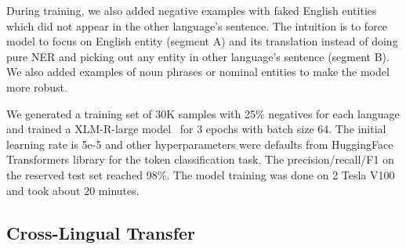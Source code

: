 \documentclass[11pt]{article}
\begin{document}
During training, we also added negative examples with faked English entities which did not appear in the other language's sentence. The intuition is to force model to focus on English entity (segment A) and its translation instead of doing pure NER and picking out any entity in other language's sentence (segment B). We also added examples of noun phrases or nominal entities to make the model more robust.

We generated a training set of 30K samples with 25$\%$ negatives for each language and trained a XLM-R-large model~\cite{Conneau2020} for 3 epochs with batch size 64. The initial learning rate is 5e-5 and other hyperparameters were defaults from HuggingFace Transformers library for the token classification task. The precision/recall/F1 on the reserved test set reached 98$\%$. The model training was done on 2 Tesla V100 and took about 20 minutes.

\subsection{Cross-Lingual Transfer}
\end{document}
